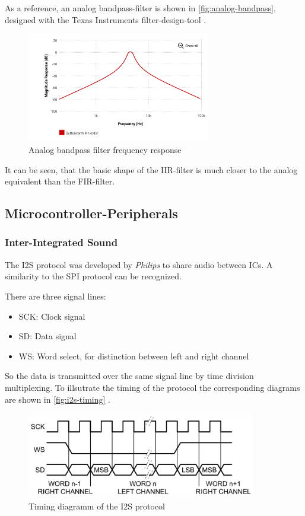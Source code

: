 As a reference, an analog bandpass-filter is shown in \autoref{fig:analog-bandpass}, designed with the Texas Instruments
filter-design-tool \cite{TI-filterdesign-tool}.

\begin{figure}[!h]
    \centering
    \includegraphics[width=8cm]{img/analog_bandpass.png}
    \caption{Analog bandpass filter frequency response}
    \label{fig:analog-bandpass}
\end{figure}

It can be seen, that the basic shape of the \ac{IIR}-filter is much closer to the analog equivalent than the
\ac{FIR}-filter.

\subsection{Microcontroller-Peripherals}

\subsubsection{Inter-Integrated Sound}

The \ac{I2S} protocol was developed by \textit{Philips} to share audio between \acp{IC}.
A similarity to the \ac{SPI} protocol can be recognized.

There are three signal lines:
\begin{itemize}
    \item SCK: Clock signal
    \item SD: Data signal
    \item WS: Word select, for distinction between left and right channel
\end{itemize}
So the data is transmitted over the same signal line by time division multiplexing. 
To illsutrate the timing of the protocol the corresponding diagrams are shown in \autoref{fig:i2s-timing} \cite{nxp_i2s}.

\begin{figure}[!h]
    \centering
    \includegraphics[width=10cm]{img/i2s_timing.png}
    \caption{Timing diagramm of the \ac{I2S} protocol \cite{nxp_i2s}}
    \label{fig:i2s-timing}
\end{figure}

